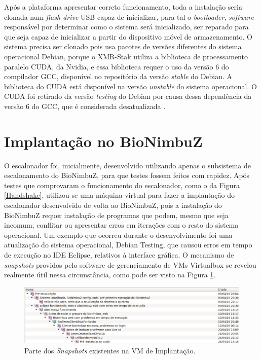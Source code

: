
Após a plataforma apresentar correto funcionamento, toda a instalação seria clonada num \textit{flash drive} \acrshort{USB} capaz de inicializar, para tal o \textit{bootloader}, \textit{software} responsável por determinar como o sistema será inicializado, ser reparado para que seja capaz de inicializar a partir do dispositivo móvel de armazenamento. O sistema precisa ser clonado pois usa pacotes de versões diferentes do sistema operacional Debian\cite{Debian}, porque o XMR-Stak utiliza a biblioteca de processamento paralelo \acrshort{CUDA}\cite{CUDA}, da Nvidia\cite{NVIDIA}, e essa biblioteca requer o uso da versão 6 do compilador \acrshort{GCC}\cite{GCC}, disponível no repositório da versão \textit{stable} do Debian. A biblioteca do CUDA está disponível na versão \textit{unstable} do sistema operacional. O \acrshort{CUDA} foi retirado da versão \textit{testing} do Debian por causa dessa dependência da versão 6 do \acrshort{GCC}, que é considerada desatualizada \cite{CUDA_BUGREP}.


\section{Implantação no BioNimbuZ}

O escalonador foi, inicialmente, desenvolvido utilizando apenas o subsistema de escalonamento do BioNimbuZ, para que testes fossem feitos com rapidez. Após testes que comprovaram o funcionamento do escalonador, como o da Figura \ref{Handshake}, utilizou-se uma máquina virtual para fazer a implantação do escalonador desenvolvido de volta ao BioNimbuZ, pois a instalação do BioNimbuZ requer instalação de programas que podem, mesmo que seja incomum, conflitar ou apresentar erros em iterações com o resto do sistema operacional. Um exemplo que ocorreu durante o desenvolvimento foi uma atualização do sistema operacional, Debian\cite{Debian} Testing\cite{DebianTesting}, que causou erros em tempo de execução no \acrfull{IDE} Eclipse\cite{JavaEclipse}, relativos à interface gráfica. O mecanismo de \textit{snapshots} providos pelo software de gerenciamento de \acrshort{VM}s Virtualbox\cite{VirtualBox} se revelou realmente útil nessa circunstância, como pode ser visto na Figura \ref{Snapshots}.

\begin{figure}[htbp]
	\centerline{\includegraphics[width=16cm]{img/Snapshots.png}}
	\caption{Parte dos \textit{Snapshots} existentes na \acrshort{VM} de Implantação.}
	\label{Snapshots}
\end{figure}

